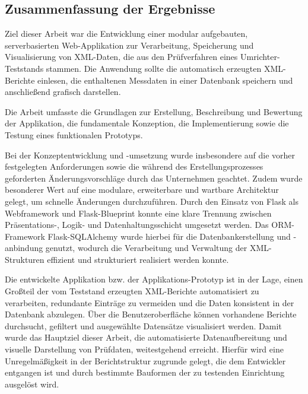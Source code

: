 \subsection{Zusammenfassung der Ergebnisse}
\label{subsec:zusammenfassung-der-ergebnisse}

Ziel dieser Arbeit war die Entwicklung einer modular aufgebauten, serverbasierten Web-Applikation zur Verarbeitung,
Speicherung und Visualisierung von XML-Daten, die aus den Prüfverfahren eines Umrichter-Teststands stammen.
Die Anwendung sollte die automatisch erzeugten XML-Berichte einlesen,
die enthaltenen Messdaten in einer Datenbank speichern und anschließend grafisch darstellen.

Die Arbeit umfasste die Grundlagen zur Erstellung, Beschreibung und Bewertung der Applikation, die fundamentale Konzeption, die Implementierung sowie die Testung eines funktionalen Prototyps.

Bei der Konzeptentwicklung und -umsetzung wurde insbesondere auf die vorher festgelegten Anforderungen sowie die während des Erstellungsprozesses geforderten Änderungsvorschläge durch das Unternehmen geachtet.
Zudem wurde besonderer Wert auf eine modulare, erweiterbare und wartbare Architektur gelegt, um schnelle Änderungen durchzuführen.
Durch den Einsatz von Flask als Webframework und Flask-Blueprint konnte eine klare Trennung zwischen Präsentations-, Logik- und Datenhaltungsschicht umgesetzt werden.
Das ORM-Framework Flask-SQLAlchemy wurde hierbei für die Datenbankerstellung und -anbindung genutzt, wodurch die Verarbeitung und Verwaltung der XML-Strukturen effizient und strukturiert realisiert werden konnte.

Die entwickelte Applikation bzw. der Applikations-Prototyp ist in der Lage, einen Großteil der vom Teststand erzeugten XML-Berichte automatisiert zu verarbeiten, redundante Einträge zu vermeiden und die Daten konsistent in der Datenbank abzulegen.
Über die Benutzeroberfläche können vorhandene Berichte durchsucht, gefiltert und ausgewählte Datensätze visualisiert werden.
Damit wurde das Hauptziel dieser Arbeit, die automatisierte Datenaufbereitung und visuelle Darstellung von Prüfdaten, weitestgehend erreicht.
Hierfür wird eine Unregelmäßigkeit in der Berichtstruktur zugrunde gelegt, die dem Entwickler entgangen ist und durch bestimmte Bauformen der zu testenden Einrichtung ausgelöst wird.



